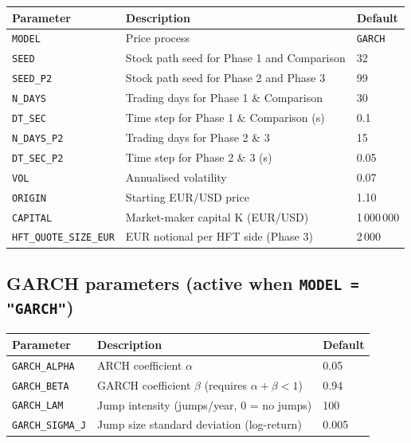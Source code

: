 \documentclass[12pt,a4paper]{article}
\begin{document}
\begin{center}
\begin{tabular}{lll}
\toprule
\textbf{Parameter} & \textbf{Description} & \textbf{Default} \\
\midrule
\texttt{MODEL}       & Price process                                   & \texttt{GARCH} \\
\texttt{SEED}        & Stock path seed for Phase 1 and Comparison      & 32 \\
\texttt{SEED\_P2}    & Stock path seed for Phase 2 and Phase 3         & 99 \\
\texttt{N\_DAYS}     & Trading days for Phase 1 \& Comparison          & 30 \\
\texttt{DT\_SEC}     & Time step for Phase 1 \& Comparison (s)         & 0.1 \\
\texttt{N\_DAYS\_P2} & Trading days for Phase 2 \& 3                   & 15 \\
\texttt{DT\_SEC\_P2} & Time step for Phase 2 \& 3 (s)                  & 0.05 \\
\texttt{VOL}         & Annualised volatility                            & 0.07 \\
\texttt{ORIGIN}      & Starting EUR/USD price                           & 1.10 \\
\texttt{CAPITAL}     & Market-maker capital K (EUR/USD)                 & 1\,000\,000 \\
\texttt{HFT\_QUOTE\_SIZE\_EUR} & EUR notional per HFT side (Phase 3)  & 2\,000 \\
\bottomrule
\end{tabular}
\end{center}

\subsection*{GARCH parameters (active when \texttt{MODEL = "GARCH"})}

\begin{center}
\begin{tabular}{lll}
\toprule
\textbf{Parameter} & \textbf{Description} & \textbf{Default} \\
\midrule
\texttt{GARCH\_ALPHA}   & ARCH coefficient $\alpha$                         & 0.05 \\
\texttt{GARCH\_BETA}    & GARCH coefficient $\beta$ (requires $\alpha+\beta<1$) & 0.94 \\
\texttt{GARCH\_LAM}     & Jump intensity (jumps/year, 0 = no jumps)         & 100 \\
\texttt{GARCH\_SIGMA\_J}& Jump size standard deviation (log-return)         & 0.005 \\
\bottomrule
\end{tabular}
\end{center}
\end{document}
